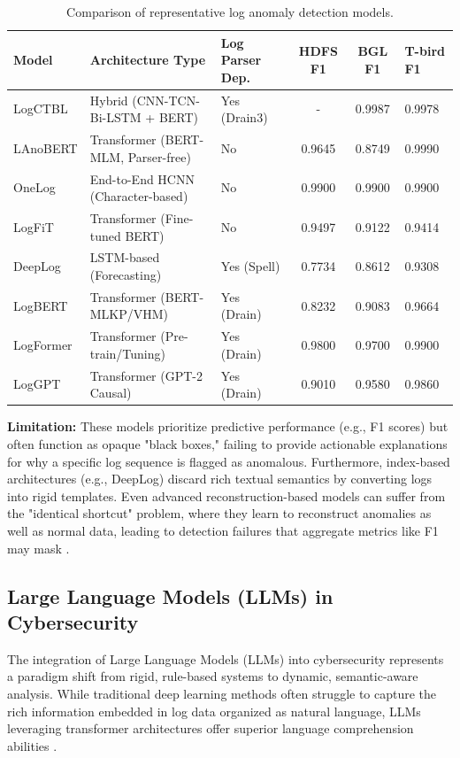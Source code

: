 \begin{table}[H]
\centering
\small
\begin{tabular}{|l|p{4.2cm}|p{2cm}|c|c|p{1.3cm}|}
\hline
\textbf{Model} & \textbf{Architecture Type} & \textbf{Log Parser Dep.} & \textbf{HDFS F1} & \textbf{BGL F1} & \textbf{T-bird F1} \\
\hline
LogCTBL \cite{LogCTBL} & Hybrid (CNN-TCN-Bi-LSTM + BERT) & Yes (Drain3) & - & 0.9987 & 0.9978 \\
LAnoBERT \cite{LAnoBERT} & Transformer (BERT-MLM, Parser-free) & No & 0.9645 & 0.8749 & 0.9990 \\
OneLog \cite{hashemi2025} & End-to-End HCNN (Character-based) & No & 0.9900 & 0.9900 & 0.9900 \\
LogFiT \cite{almodovar-etal-2022-language} & Transformer (Fine-tuned BERT) & No & 0.9497 & 0.9122 & 0.9414 \\
DeepLog \cite{DeepLog} & LSTM-based (Forecasting) & Yes (Spell) & 0.7734 & 0.8612 & 0.9308 \\
LogBERT \cite{LogBERT} & Transformer (BERT-MLKP/VHM) & Yes (Drain) & 0.8232 & 0.9083 & 0.9664 \\
LogFormer \cite{LogFormer} & Transformer (Pre-train/Tuning) & Yes (Drain) & 0.9800 & 0.9700 & 0.9900 \\
LogGPT \cite{LogGPT} & Transformer (GPT-2 Causal) & Yes (Drain) & 0.9010 & 0.9580 & 0.9860 \\
\hline
\end{tabular}
\caption{Comparison of representative log anomaly detection models.}
\label{tab:models}
\end{table}

\textbf{Limitation:} These models prioritize predictive performance (e.g., F1 scores) but often function as opaque "black boxes," failing to provide actionable explanations for why a specific log sequence is flagged as anomalous. Furthermore, index-based architectures (e.g., DeepLog) discard rich textual semantics by converting logs into rigid templates. Even advanced reconstruction-based models can suffer from the "identical shortcut" problem, where they learn to reconstruct anomalies as well as normal data, leading to detection failures that aggregate metrics like F1 may mask \cite{MLAD}.


\subsection{Large Language Models (LLMs) in Cybersecurity}
The integration of Large Language Models (LLMs) into cybersecurity represents a paradigm shift from rigid, rule-based systems to dynamic, semantic-aware analysis. While traditional deep learning methods often struggle to capture the rich information embedded in log data organized as natural language, LLMs leveraging transformer architectures offer superior language comprehension abilities \cite{LogLLM}.

